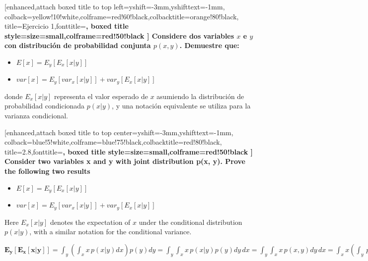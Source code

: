 \documentclass{article}
\begin{document}
\begin {tcolorbox}
	[enhanced,attach boxed title to top left={yshift=-3mm,yshifttext=-1mm}, colback=yellow!10!white,colframe=red!60!black,colbacktitle=orange!80!black, title=Ejercicio 1,fonttitle=\bfseries, boxed title style={size=small,colframe=red!50!black} ]
	Considere dos variables $x$ e $y$ con distribuci\'on de probabilidad conjunta $p\left(x,y\right)$. Demuestre que:
	\begin{itemize}
    	\item $E\left[x\right]=E_y\left[E_x\left[x|y\right]\right]$
    	\item $var\left[x\right]=E_y\left[ var_{x}\left[ x|y\right]\right] + var_{y}\left[E_x\left[x|y\right]\right]$
	\end{itemize}
    	donde $E_x\left[x|y\right]$ representa el valor esperado de $x$ asumiendo la distribuci\'on de probabilidad condicionada $p\left(x|y\right)$, y una notaci\'on equivalente se utiliza para la varianza condicional.
	
	\begin {tcolorbox}
    	[enhanced,attach boxed title to top center={yshift=-3mm,yshifttext=-1mm}, colback=blue!5!white,colframe=blue!75!black,colbacktitle=red!80!black, title=2.8,fonttitle=\bfseries, boxed title style={size=small,colframe=red!50!black} ]
    	Consider two variables x and y with joint distribution p(x, y). Prove the following two results
    \begin{itemize}
    	\item $E\left[x\right]=E_y\left[E_x\left[x|y\right]\right]$
    	\item $var\left[x\right]=E_y\left[ var_{x}\left[ x|y\right]\right] + var_{y}\left[E_x\left[x|y\right]\right]$
	\end{itemize}
    	Here $E_x\left[x|y\right]$ denotes the expectation of $x$ under the conditional distribution $p\left(x|y\right)$, with a similar notation for the conditional variance.
	\end{tcolorbox}
\end{tcolorbox}
$ \displaystyle
    \mathbf{E_y\left[E_x\left[x|y\right]\right]}=  
    \int_{y} \left( \int_{x}x\,p\left(x|y \right)dx \right)p\left(y \right)dy= 
    \int_{y} \int_{x}x\,p\left(x|y \right)p\left(y \right)dy\,dx =
    \int_{y} \int_{x}x\,p\left(x,y \right)dy\,dx =
    \int_{x} x \left(\int_{y}\,p\left(x,y \right)dy\right)dx =
    \int_{x} p\left(x\right)dx = \mathbf{E\left[x\right]}
$ \\
\end{document}

